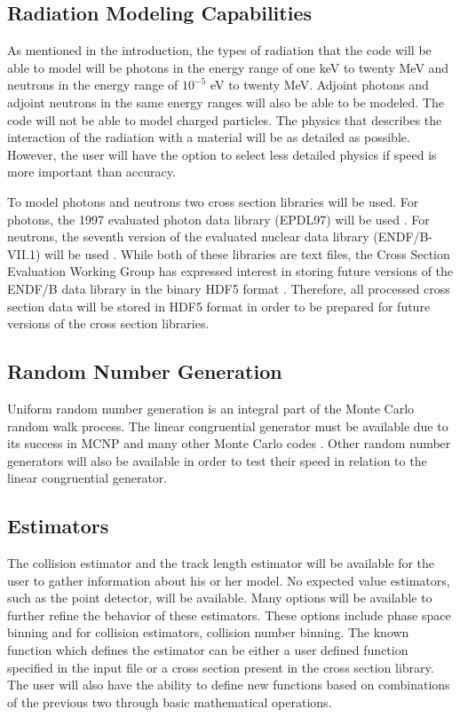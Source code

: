 \subsection{Radiation Modeling Capabilities}
As mentioned in the introduction, the types of radiation that the code will be 
able to model will be photons in the energy range of one keV to twenty MeV and 
neutrons in the energy range of $10^{-5}$ eV to twenty MeV. Adjoint photons and 
adjoint neutrons in the same energy ranges will also be able to be modeled. 
The code will not be able to model charged particles. The physics that 
describes the interaction of the radiation with a material will be as detailed
as possible. However, the user will have the option to select less detailed
physics if speed is more important than accuracy. 

To model photons and neutrons two cross section libraries will be used. For
photons, the 1997 evaluated photon data library (EPDL97) will be used 
\citep{cullen_epdl97_1997}. For neutrons, the seventh version of the evaluated 
nuclear data library (ENDF/B-VII.1) will be used 
\citep{chadwick_endf/b-vii.1_2011}. While both of these libraries are text 
files, the Cross Section Evaluation Working Group has expressed interest 
in storing future versions of the ENDF/B data library in the binary HDF5 format 
\citep{mattoon_generalized_2012}. Therefore, all processed cross section data
will be stored in HDF5 format in order to be prepared for future versions of
the cross section libraries. 

\subsection{Random Number Generation}
Uniform random number generation is an integral part of the Monte Carlo random
walk process. The linear congruential generator must be available due to its
success in MCNP and many other Monte Carlo codes \citep{brown_mcnp5_2002}. 
Other random number generators will also be available in order to test their
speed in relation to the linear congruential generator.

\subsection{Estimators}
The collision estimator and the track length estimator will be available for 
the user to gather information about his or her model. No expected value 
estimators, such as the point detector, will be available. Many options will be 
available to further refine the behavior of these estimators. These options 
include phase space binning and for collision estimators, collision number 
binning. The known function which defines the estimator can be either a user 
defined function specified in the input file or a cross section present in the 
cross section library. The user will also have the ability to define new 
functions based on combinations of the previous two through basic mathematical 
operations. 

